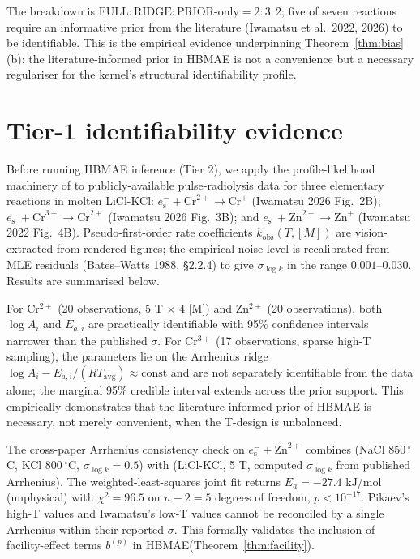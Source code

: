 \documentclass[11pt]{article}
\theoremstyle{definition}
\theoremstyle{remark}
\newcommand{\eS}{e_{\mathrm{s}}^{-}\xspace}
\newcommand{\HBMAE}{HBMAE\xspace}
\begin{document}
The breakdown is $\mathrm{FULL}\!:\!\mathrm{RIDGE}\!:\!\mathrm{PRIOR\text{-}only} = 2\!:\!3\!:\!2$;
five of seven reactions require an informative prior from the literature
(Iwamatsu et al.\ 2022, 2026) to be identifiable. This is the empirical evidence
underpinning Theorem~\ref{thm:bias}(b): the literature-informed prior in HBMAE is
not a convenience but a necessary regulariser for the kernel's structural
identifiability profile.

\section{Tier-1 identifiability evidence}\label{sec:tier1}

Before running \HBMAE inference (Tier 2), we apply the profile-likelihood machinery of
\citet{Raue2009} to publicly-available pulse-radiolysis data for three elementary
reactions in molten LiCl-KCl: $\eS+\mathrm{Cr}^{2+}\to\mathrm{Cr}^+$ (Iwamatsu 2026
Fig.~2B); $\eS+\mathrm{Cr}^{3+}\to\mathrm{Cr}^{2+}$ (Iwamatsu 2026 Fig.~3B); and
$\eS+\mathrm{Zn}^{2+}\to\mathrm{Zn}^+$ (Iwamatsu 2022 Fig.~4B). Pseudo-first-order rate
coefficients $k_{\mathrm{obs}}(T,[M])$ are vision-extracted from rendered figures; the
empirical noise level is recalibrated from MLE residuals (Bates--Watts 1988, \S 2.2.4)
to give $\sigma_{\log k}$ in the range $0.001$--$0.030$. Results are summarised below.

For Cr$^{2+}$ (20 observations, 5 T $\times$ 4 [M]) and Zn$^{2+}$ (20 observations),
both $\log A_i$ and $E_{a,i}$ are practically identifiable with 95\% confidence intervals
narrower than the published $\sigma$. For Cr$^{3+}$ (17 observations, sparse high-T
sampling), the parameters lie on the Arrhenius ridge $\log A_i - E_{a,i}/(RT_{\mathrm{avg}})\approx\mathrm{const}$
and are not separately identifiable from the data alone; the marginal 95\% credible
interval extends across the prior support. This empirically demonstrates that the
literature-informed prior of \HBMAE is necessary, not merely convenient, when the
T-design is unbalanced.

The cross-paper Arrhenius consistency check on $\eS+\mathrm{Zn}^{2+}$ combines
\citet{Pikaev1982} (NaCl 850\,$^\circ$C, KCl 800\,$^\circ$C, $\sigma_{\log k}=0.5$) with
\citet{Iwamatsu2022} (LiCl-KCl, 5 T, computed $\sigma_{\log k}$ from published Arrhenius).
The weighted-least-squares joint fit returns $E_a=-27.4$ kJ/mol (unphysical) with
$\chi^2=96.5$ on $n-2=5$ degrees of freedom, $p<10^{-17}$. Pikaev's high-T values and
Iwamatsu's low-T values cannot be reconciled by a single Arrhenius within their reported
$\sigma$. This formally validates the inclusion of facility-effect terms $b^{(p)}$ in
\HBMAE (Theorem~\ref{thm:facility}).
\end{document}
